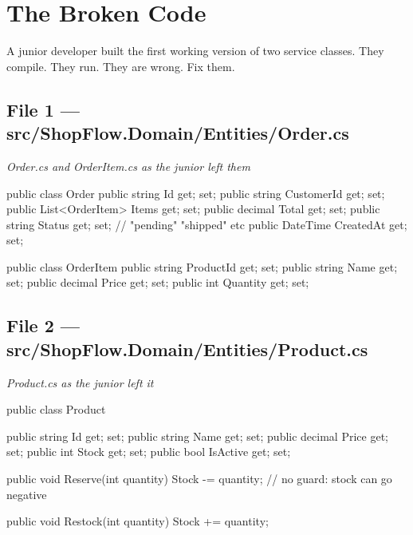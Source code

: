 \documentclass[11pt,a4paper]{article}
\newcommand{\codelabel}[1]{%
  \vspace{2pt}%
  {\footnotesize\color{gray}\textit{#1}}%
  \vspace{2pt}%
}
\begin{document}
\newpage
\section{The Broken Code}

A junior developer built the first working version of two service classes.
They compile. They run. They are wrong. Fix them.

\subsection{File 1 --- src/ShopFlow.Domain/Entities/Order.cs}

\codelabel{Order.cs and OrderItem.cs as the junior left them}
\begin{codeframe}
\begin{codeblock}
public class Order
{
    public string          Id         { get; set; }
    public string          CustomerId { get; set; }
    public List<OrderItem> Items      { get; set; }
    public decimal         Total      { get; set; }
    public string          Status     { get; set; }  // "pending" "shipped" etc
    public DateTime        CreatedAt  { get; set; }
}

public class OrderItem
{
    public string  ProductId { get; set; }
    public string  Name      { get; set; }
    public decimal Price     { get; set; }
    public int     Quantity  { get; set; }
}
\end{codeblock}
\end{codeframe}

\subsection{File 2 --- src/ShopFlow.Domain/Entities/Product.cs}

\codelabel{Product.cs as the junior left it}
\begin{codeframe}
\begin{codeblock}
public class Product
{
    public string  Id       { get; set; }
    public string  Name     { get; set; }
    public decimal Price    { get; set; }
    public int     Stock    { get; set; }
    public bool    IsActive { get; set; }

    public void Reserve(int quantity)
    {
        Stock -= quantity;   // no guard: stock can go negative
    }

    public void Restock(int quantity)
    {
        Stock += quantity;
    }
}
\end{codeblock}
\end{codeframe}
\end{document}
